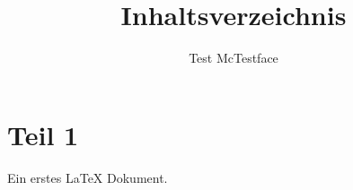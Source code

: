 \documentclass[ngerman]{scrartcl}
\title{Inhaltsverzeichnis}
\author{Test McTestface}
\begin{document}
\maketitle

\tableofcontents

\section{Teil 1}         

Ein erstes \LaTeX{} Dokument.
\end{document}
